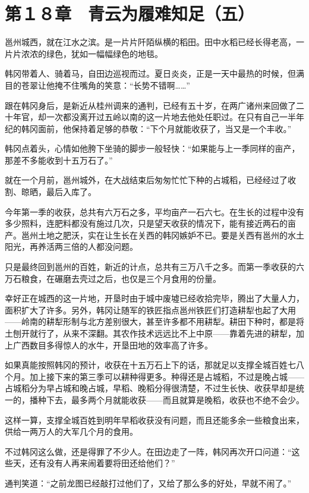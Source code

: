 \section{第１８章　青云为履难知足（五）}

邕州城西，就在江水之滨。是一片片阡陌纵横的稻田。田中水稻已经长得老高，一片片浓浓的绿色，犹如一幅幅绿色的地毯。

韩冈带着人、骑着马，自田边巡视而过。夏日炎炎，正是一天中最热的时候，但满目的苍翠让他掩不住嘴角的笑意：“长势不错啊……”

跟在韩冈身后，是新近从桂州调来的通判，已经有五十岁，在两广诸州来回做了二十年官，却一次都没离开过五岭以南的这一片地去他处任职过。在只有自己一半年纪的韩冈面前，他保持着足够的恭敬：“下个月就能收获了，当又是一个丰收。”

韩冈点着头，心情如他胯下坐骑的脚步一般轻快：“如果能与上一季同样的亩产，那差不多能收到十五万石了。”

就在一个月前，邕州城外，在大战结束后匆匆忙忙下种的占城稻，已经经过了收割、晾晒，最后入库了。

今年第一季的收获，总共有六万石之多，平均亩产一石六七。在生长的过程中没有多少照料，连肥料都没有施过几次，只是望天收获的情况下，能有接近两石的亩产。邕州土地之肥沃，实在让生长在关西的韩冈嫉妒不已。要是关西有邕州的水土阳光，再养活两三倍的人都没问题。

只是最终回到邕州的百姓，新近的计点，总共有三万八千之多。而第一季收获的六万石粮食，在碾磨去壳过之后，也仅是三个月食用的份量。

幸好正在城西的这一片地，开垦时由于城中废墟已经收拾完毕，腾出了大量人力，面积扩大了许多。另外，韩冈让随军的铁匠指点邕州铁匠们打造耕犁也起了大用——岭南的耕犁形制与北方差别很大，甚至许多都不用耕犁。耕田下种时，都是将土刨开就行了，从来不深翻。其农作技术远远比不上中原——靠着先进的耕犁，加上广西数目多得惊人的水牛，开垦田地的效率高了许多。

如果真能按照韩冈的预计，收获在十五万石上下的话，那就足以支撑全城百姓七八个月。加上接下来的第三季可以耕种得更多。种得还是占城稻，不过是晚占城——占城稻分为早占城和晚占城，早稻、晚稻分得很清楚，不过生长快、收获早却是统一的，播种下去，最多两个月就能收获——而且就算是晚稻，收获也不绝不会少。

这样一算，支撑全城百姓到明年早稻收获没有问题，而且还能多余一些粮食出来，供给一两万人的大军几个月的食用。

不过韩冈这么做，还是得罪了不少人。在田边走了一阵，韩冈再次开口问道：“这些天，还有没有人再来闹着要将田还给他们？”

通判笑道：“之前龙图已经敲打过他们了，又给了那么多的好处，早就不闹了。”

